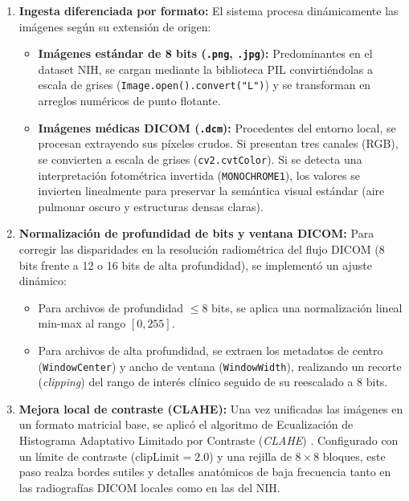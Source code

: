 \documentclass[../main.tex]{subfiles}
\begin{document}
\begin{enumerate}
    \item \textbf{Ingesta diferenciada por formato:} El sistema procesa dinámicamente las imágenes según su extensión de origen:
    \begin{itemize}
        \item \textbf{Imágenes estándar de 8 bits (\texttt{.png}, \texttt{.jpg}):} Predominantes en el dataset NIH, se cargan mediante la biblioteca PIL convirtiéndolas a escala de grises (\texttt{Image.open().convert("L")}) y se transforman en arreglos numéricos de punto flotante.
        \item \textbf{Imágenes médicas DICOM (\texttt{.dcm}):} Procedentes del entorno local, se procesan extrayendo sus píxeles crudos. Si presentan tres canales (RGB), se convierten a escala de grises (\texttt{cv2.cvtColor}). Si se detecta una interpretación fotométrica invertida (\texttt{MONOCHROME1}), los valores se invierten linealmente para preservar la semántica visual estándar (aire pulmonar oscuro y estructuras densas claras).
    \end{itemize}
    
    \item \textbf{Normalización de profundidad de bits y ventana DICOM:} Para corregir las disparidades en la resolución radiométrica del flujo DICOM (8 bits frente a 12 o 16 bits de alta profundidad), se implementó un ajuste dinámico:
    \begin{itemize}
        \item Para archivos de profundidad $\le 8$ bits, se aplica una normalización lineal min-max al rango $[0, 255]$.
        \item Para archivos de alta profundidad, se extraen los metadatos de centro (\texttt{WindowCenter}) y ancho de ventana (\texttt{WindowWidth}), realizando un recorte (\textit{clipping}) del rango de interés clínico seguido de su reescalado a 8 bits.
    \end{itemize}
    
    \item \textbf{Mejora local de contraste (CLAHE):} Una vez unificadas las imágenes en un formato matricial base, se aplicó el algoritmo de Ecualización de Histograma Adaptativo Limitado por Contraste (\textit{CLAHE}) \citep{Zuiderveld1994}. Configurado con un límite de contraste ($\text{clipLimit} = 2.0$) y una rejilla de $8 \times 8$ bloques, este paso realza bordes sutiles y detalles anatómicos de baja frecuencia tanto en las radiografías DICOM locales como en las del NIH.
    

\end{enumerate}
\end{document}
